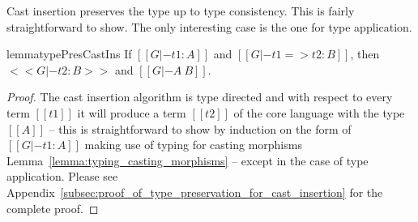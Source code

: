 Cast insertion preserves the type up to type consistency.  This is
fairly straightforward to show.  The only interesting case is the one
for type application.
\begin{restatable}{lemma}{typePresCastIns}
  \label{lemma:type_preservation_for_cast_insertion}
  If $[[G |- t1 : A]]$ and $[[G |- t1 => t2 : B]]$, then $<<G |- t2 : B>>$ and $[[G |- A ~ B]]$.
\end{restatable}
\begin{proof}
  The cast insertion algorithm is type directed and with respect to
  every term $[[t1]]$ it will produce a term $[[t2]]$ of the core
  language with the type $[[A]]$ -- this is straightforward to show by
  induction on the form of $[[G |- t1 : A]]$ making use of typing for
  casting morphisms Lemma~\ref{lemma:typing_casting_morphisms} --
  except in the case of type application.  Please see
  Appendix~\ref{subsec:proof_of_type_preservation_for_cast_insertion}
  for the complete proof.
\end{proof}

